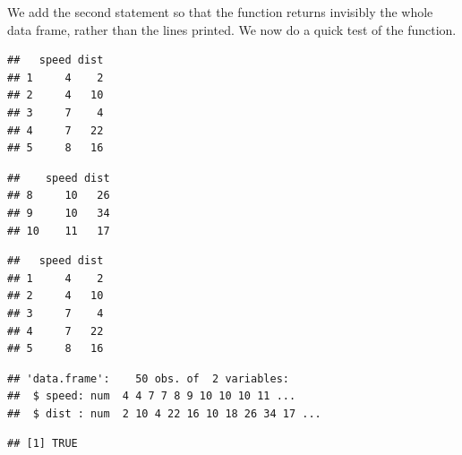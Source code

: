 \documentclass[krantz2]{krantz}\usepackage{knitr}%
\begin{document}
\begin{explainbox}
We add the second statement so that the function returns invisibly the whole data frame, rather than the lines printed. We now do a quick test of the function.

\begin{knitrout}\footnotesize
{}\color{fgcolor}\begin{kframe}
\begin{alltt}
\end{alltt}
\begin{verbatim}
##   speed dist
## 1     4    2
## 2     4   10
## 3     7    4
## 4     7   22
## 5     8   16
\end{verbatim}
\begin{alltt}
 \hlopt{:}\hlstd{)}
\end{alltt}
\begin{verbatim}
##    speed dist
## 8     10   26
## 9     10   34
## 10    11   17
\end{verbatim}
\begin{alltt}
 \hlkwb{<-} 
\end{alltt}
\begin{verbatim}
##   speed dist
## 1     4    2
## 2     4   10
## 3     7    4
## 4     7   22
## 5     8   16
\end{verbatim}
\begin{alltt}
\end{alltt}
\begin{verbatim}
## 'data.frame':	50 obs. of  2 variables:
##  $ speed: num  4 4 7 7 8 9 10 10 10 11 ...
##  $ dist : num  2 10 4 22 16 10 18 26 34 17 ...
\end{verbatim}
\begin{alltt}
 \hlopt{==}  
\end{alltt}
\begin{verbatim}
## [1] TRUE
\end{verbatim}
\end{kframe}
\end{knitrout}

%
\end{explainbox}
\end{document}
